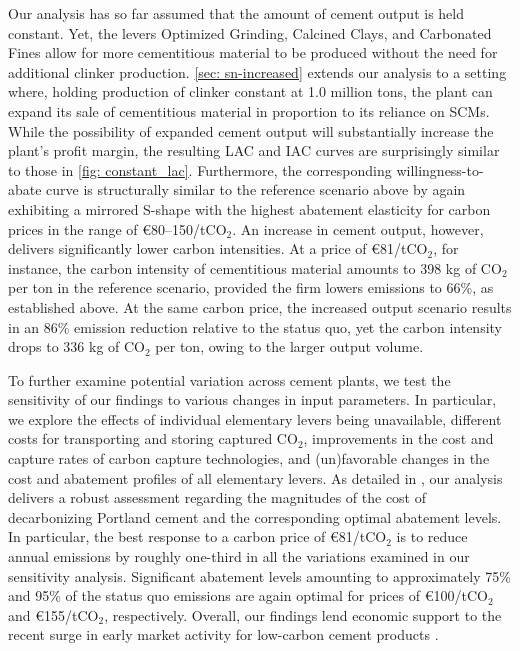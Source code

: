 \documentclass[12pt, a4paper]{article} %
\newcommand{\methods}{\nameref{sec: methods}} %
\begin{document}
Our analysis has so far assumed that the amount of cement output is held constant. Yet, the levers Optimized Grinding, Calcined Clays, and Carbonated Fines allow for more cementitious material to be produced without the need for additional clinker production. \ref{sec: sn-increased} extends our analysis to a setting where, holding production of clinker constant at 1.0 million tons, the plant can expand its sale of cementitious material in proportion to its reliance on SCMs. While the possibility of expanded cement output will substantially increase the plant's profit margin, the resulting LAC and IAC curves are surprisingly similar to those in \autoref{fig: constant_lac}. Furthermore, the corresponding willingness-to-abate curve is structurally similar to the reference scenario above by again exhibiting a mirrored S-shape with the highest abatement elasticity for carbon prices in the range of \euro 80--150/tCO$_2$. An increase in cement output, however, delivers significantly lower carbon intensities. At a price of \euro 81/tCO$_2$, for instance, the carbon intensity of cementitious material amounts to 398 kg of CO$_2$ per ton  in the reference scenario, provided the firm lowers emissions to 66\%, as established above. At the same carbon price, the increased output scenario results in an 86\% emission reduction relative to the status quo, yet the carbon intensity drops to 336 kg of CO$_2$ per ton, owing to the larger output volume.

To further examine potential variation across cement plants, we test the sensitivity of our findings to various changes in input parameters. In particular, we explore the effects of individual elementary levers being unavailable, different costs for transporting and storing captured CO$_2$, improvements in the cost and capture rates of carbon capture technologies, and (un)favorable changes in the cost and abatement profiles of all elementary levers. As detailed in \methods, our analysis delivers a robust assessment regarding the magnitudes of the cost of decarbonizing Portland cement and the corresponding optimal abatement levels. In particular, the best response to a carbon price of \euro 81/tCO$_2$ is to reduce annual emissions by roughly one-third in all the variations examined in our sensitivity analysis. Significant abatement levels amounting to approximately 75\% and 95\% of the status quo emissions are again optimal for prices of \euro 100/tCO$_2$ and \euro 155/tCO$_2$, respectively. Overall, our findings lend economic support to the recent surge in early market activity for low-carbon cement products \citep{research2022global,george2022report,fennell2022going,hm2023heidelberg}.
\end{document}
